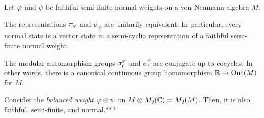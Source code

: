 \documentclass{../../small}
\begin{document}
\begin{thm}
Let $\varphi$ and $\psi$ be faithful semi-finite normal weights on a von Neumann algebra $M$.
\begin{parts}
\item The representations $\pi_\varphi$ and $\psi_\psi$ are unitarily equivalent.
In particular, every normal state is a vector state in a semi-cyclic reprsentation of a faithful semi-finite normal weight.
\item The modular automorphism groups $\sigma_t^\varphi$ and $\sigma_t^\psi$ are conjugate up to cocycles.
In other words, there is a canonical continuous group homomorphism $\mathbb{R}\to\operatorname{Out}(M)$ for $M$.
\item 
\end{parts}
\end{thm}
\begin{pf}
Consider the \emph{balanced weight} $\varphi\oplus\psi$ on $M\otimes M_2(\mathbb{C})=M_2(M)$.
Then, it is also faithful, semi-finite, and normal.***


\end{pf}
\end{document}
